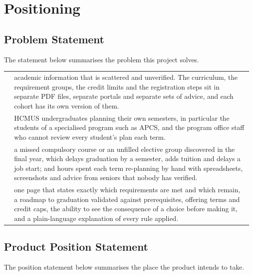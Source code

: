 \documentclass{article}
\begin{document}
\section{Positioning}
\subsection{Problem Statement}
The statement below summarises the problem this project solves.

{\small
\begin{xltabular}{\dimexpr{}\tabcolsep\relax}{@{}>{\RaggedRight\arraybackslash}p{4.0cm}Y@{}}
 & academic information that is scattered and unverified. The curriculum, the
requirement groups, the credit limits and the registration steps sit in separate PDF files, separate portals and separate
sets of advice, and each cohort has its own version of them.\\
 & HCMUS undergraduates planning their own semesters, in particular the students of a
specialised program such as APCS, and the program office staff who cannot review every student's plan each term.\\
 & a missed compulsory course or an unfilled elective group discovered in
the final year, which delays graduation by a semester, adds tuition and delays a job start; and hours spent each term
re-planning by hand with spreadsheets, screenshots and advice from seniors that nobody has verified.\\
 & one page that states exactly which requirements are met and
which remain, a roadmap to graduation validated against prerequisites, offering terms and credit caps, the ability to see
the consequence of a choice before making it, and a plain-language explanation of every rule applied.\\
\end{xltabular}}

\subsection{Product Position Statement}
The position statement below summarises the place the product intends to take.
\end{document}
